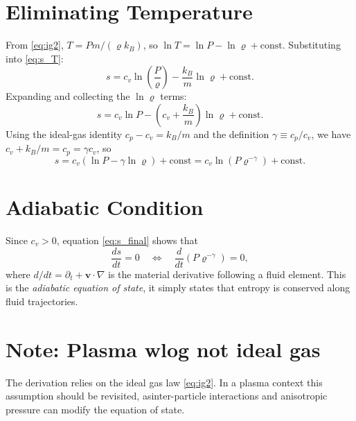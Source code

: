 \section{Eliminating Temperature}
 
From \eqref{eq:ig2}, $T = Pm/( \varrho k_B)$, so $\ln T = \ln P - \ln \varrho +
\text{const}$. Substituting into \eqref{eq:s_T}:
\begin{equation*}
    s = c_v\ln\!\left(\frac{P}{ \varrho}\right) - \frac{k_B}{m}\ln \varrho + \text{const}.
\end{equation*}
Expanding and collecting the $\ln \varrho$ terms:
\begin{equation*}
    s = c_v\ln P - \left(c_v + \frac{k_B}{m}\right)\ln \varrho + \text{const}.
\end{equation*}
Using the ideal-gas identity $c_p - c_v = k_B/m$ and the definition
$\gamma \equiv c_p/c_v$, we have $c_v + k_B/m = c_p = \gamma c_v$, so
\begin{equation}
    s = c_v\!\left(\ln P - \gamma\ln \varrho\right) + \text{const}
      = c_v\ln\!\left(P \varrho^{-\gamma}\right) + \text{const}.
    \label{eq:s_final}
\end{equation}
 
\section{Adiabatic Condition}
 
Since $c_v > 0$, equation \eqref{eq:s_final} shows that
\begin{equation*}
    \frac{ds}{dt} = 0
    \quad\iff\quad
    \frac{d}{dt}\!\left(P \varrho^{-\gamma}\right) = 0,
\end{equation*}
where $d/dt = \partial_t + \mathbf{v}\cdot\nabla$ is the material derivative
following a fluid element. This is the \emph{adiabatic equation of state}, it simply states 
 that entropy is conserved along fluid trajectories.
 

\section{Note: Plasma wlog not ideal gas}
The derivation relies on the ideal gas law \eqref{eq:ig2}. In a plasma context this assumption should
be revisited, asinter-particle interactions and anisotropic pressure can modify the equation of state.
